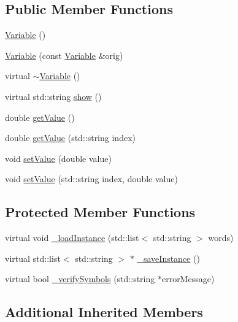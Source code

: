 \subsection*{Public Member Functions}
\begin{DoxyCompactItemize}
\item 
\hyperlink{class_variable_a5716c9dcafcc8cf59a6f6b5dac3ec7a2}{Variable} ()
\item 
\hyperlink{class_variable_a1974dd984e1ee5bf74f25d03301108c1}{Variable} (const \hyperlink{class_variable}{Variable} \&orig)
\item 
virtual \hyperlink{class_variable_acfc14d0ad77af53025f890b4d3a7745a}{$\sim$\+Variable} ()
\item 
virtual std\+::string \hyperlink{class_variable_a8bd0a772bb32fd630e252306306cd154}{show} ()
\item 
double \hyperlink{class_variable_a010d43b1092dbc6c3a1c2e0e3e4fc611}{get\+Value} ()
\item 
double \hyperlink{class_variable_a7f127c40dfbac529972ce03daf42a944}{get\+Value} (std\+::string index)
\item 
void \hyperlink{class_variable_a04078db9b38af4589e50ff4c6f468086}{set\+Value} (double value)
\item 
void \hyperlink{class_variable_a8403bc8f6c01702e1f3d6e0031731bca}{set\+Value} (std\+::string index, double value)
\end{DoxyCompactItemize}
\subsection*{Protected Member Functions}
\begin{DoxyCompactItemize}
\item 
virtual void \hyperlink{class_variable_a37db5791f858048daf0549d2ea3f3a62}{\+\_\+load\+Instance} (std\+::list$<$ std\+::string $>$ words)
\item 
virtual std\+::list$<$ std\+::string $>$ $\ast$ \hyperlink{class_variable_a67373d2c7210dd0cab25b4c4df1b5c0e}{\+\_\+save\+Instance} ()
\item 
virtual bool \hyperlink{class_variable_ad29a567d28d673450fb1ecd193bd8d90}{\+\_\+verify\+Symbols} (std\+::string $\ast$error\+Message)
\end{DoxyCompactItemize}
\subsection*{Additional Inherited Members}


